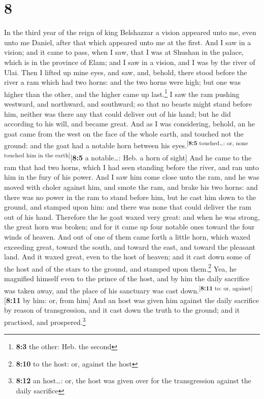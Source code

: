 \hypertarget{section-7}{%
\section{8}\label{section-7}}

 In the third year of the reign of king Belshazzar a
vision appeared unto me, even unto me Daniel, after that which appeared
unto me at the first.  And I saw in a vision; and it came
to pass, when I saw, that I was at Shushan in the palace, which is in
the province of Elam; and I saw in a vision, and I was by the river of
Ulai.  Then I lifted up mine eyes, and saw, and, behold,
there stood before the river a ram which had two horns: and the two
horns were high; but one was higher than the other, and the higher came
up last.\footnote{\textbf{8:3} the other: Heb. the second}
 I saw the ram pushing westward, and northward, and
southward; so that no beasts might stand before him, neither was there
any that could deliver out of his hand; but he did according to his
will, and became great.  And as I was considering, behold,
an he goat came from the west on the face of the whole earth, and
touched not the ground: and the goat had a notable horn between his
eyes.\textsuperscript{{[}\textbf{8:5} touched\ldots: or, none touched
him in the earth{]}}{[}\textbf{8:5} a notable\ldots: Heb. a horn of
sight{]}  And he came to the ram that had two horns, which
I had seen standing before the river, and ran unto him in the fury of
his power.  And I saw him come close unto the ram, and he
was moved with choler against him, and smote the ram, and brake his two
horns: and there was no power in the ram to stand before him, but he
cast him down to the ground, and stamped upon him: and there was none
that could deliver the ram out of his hand.  Therefore the
he goat waxed very great: and when he was strong, the great horn was
broken; and for it came up four notable ones toward the four winds of
heaven.  And out of one of them came forth a little horn,
which waxed exceeding great, toward the south, and toward the east, and
toward the pleasant land.  And it waxed great, even to
the host of heaven; and it cast down some of the host and of the stars
to the ground, and stamped upon them.\footnote{\textbf{8:10} to the
  host: or, against the host}  Yea, he magnified himself
even to the prince of the host, and by him the daily sacrifice was taken
away, and the place of his sanctuary was cast
down.\textsuperscript{{[}\textbf{8:11} to: or,
against{]}}{[}\textbf{8:11} by him: or, from him{]}  And
an host was given him against the daily sacrifice by reason of
transgression, and it cast down the truth to the ground; and it
practised, and prospered.\footnote{\textbf{8:12} an host\ldots: or, the
  host was given over for the transgression against the daily sacrifice}


